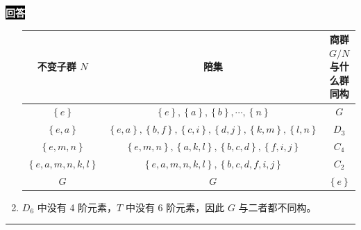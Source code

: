 \documentclass[11pt,a4paper]{ctexart}
\newenvironment{answer}
  {\par\smallskip\noindent
   \begingroup
   \setlength{\fboxsep}{4pt}%
   \colorbox{black}{\textcolor{white}{\bfseries 回答}}%
   \endgroup
   \quad\ignorespaces}
  {\par\smallskip\noindent\rule{\linewidth}{0.4pt}\medskip}
\begin{document}
\begin{answer}
\begin{enumerate}
      \begin{center}
        \begin{tabular}{c|cc}
          不变子群 $N $ &陪集 &商群 $G/N $ 与什么群同构 \\ \hline
          $\left\{e \right\} $ &$\left\{e \right\},\left\{a \right\},\left\{b \right\},\cdots,\left\{n \right\} $ &$G $ \\
          $\left\{e,a \right\} $ &$\left\{e,a \right\},\left\{b,f \right\},\left\{c,i \right\},\left\{d,j \right\},\left\{k,m \right\},\left\{l,n \right\} $ &$D_3 $ \\
          $\left\{e,m,n \right\} $ &$\left\{e,m,n \right\},\left\{a,k,l \right\},\left\{b,c,d \right\},\left\{f,i,j \right\} $ &$C_4 $ \\
          $\left\{e,a,m,n,k,l \right\} $ &$\left\{e,a,m,n,k,l \right\},\left\{b,c,d,f,i,j \right\} $ &$C_2 $ \\ 
          $G $ &$G $ &$\left\{e \right\} $ \\ \hline
        \end{tabular}
      \end{center}
    \item $D_6 $ 中没有 4 阶元素，$T $ 中没有 6 阶元素，因此 $G $ 与二者都不同构。
\end{enumerate}
\end{answer}
\end{document}
